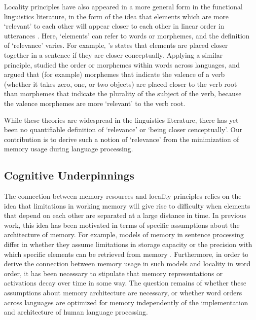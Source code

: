 Locality principles have also appeared in a more general form in the functional linguistics literature, in the form of the idea that elements which are more `relevant' to each other will appear closer to each other in linear order in utterances \citep{behaghel1932deutsche,givon1985iconicity,givon1991markedness,bybee-morphology-1985,newmeyer1992iconicity}. Here, `elements' can refer to words or morphemes, and the definition of `relevance' varies. For example, \citet{givon1985iconicity}'s  states that elements are placed closer together in a sentence if they are closer conceptually.
Applying a similar principle, \citet{bybee-morphology-1985} studied the order or morphemes within words across languages, and argued that (for example) morphemes that indicate the valence of a verb (whether it takes zero, one, or two objects) are placed closer to the verb root than morphemes that indicate the plurality of the subject of the verb, because the valence morphemes are more `relevant' to the verb root. %

While these theories are widespread in the linguistics literature, there has yet been no quantifiable definition of `relevance' or `being closer cenceptually'. Our contribution is to derive such a notion of `relevance' from the minimization of memory usage during language processing.


\subsection{Cognitive Underpinnings}

The connection between memory resources and locality principles relies on the idea that limitations in working memory will give rise to difficulty when elements that depend on each other are separated at a large distance in time. In previous work, this idea has been motivated in terms of specific assumptions about the architecture of memory. For example, models of memory in sentence processing differ in whether they assume limitations in storage capacity \citep[e.g.][]{gibson1998linguistic} or the precision with which specific elements can be retrieved from memory \citep[e.g.][]{lewis-activation-based-2005}. Furthermore, in order to derive the connection between memory usage in such models and locality in word order, it has been necessary to stipulate that memory representations or activations decay over time in some way. The question remains of whether these assumptions about memory architecture are necessary, or whether word orders across languages are optimized for memory independently of the implementation and architecture of human language processing.

